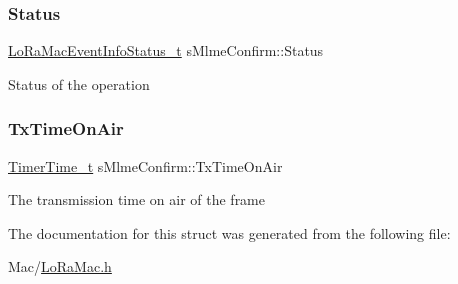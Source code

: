 \subsubsection{\texorpdfstring{Status}{Status}}
{\footnotesize\ttfamily \hyperlink{group__LORAMAC_gac6ffc346a4c767f7a743c87a686c51b4}{Lo\+Ra\+Mac\+Event\+Info\+Status\+\_\+t} s\+Mlme\+Confirm\+::\+Status}

Status of the operation \mbox{\label{structsMlmeConfirm_a56411a350cd4b3f8ee59adc9105e5b5e}} 
\subsubsection{\texorpdfstring{Tx\+Time\+On\+Air}{TxTimeOnAir}}
{\footnotesize\ttfamily \hyperlink{utilities_8h_a4215ca43d3e953099ea758ce428599d0}{Timer\+Time\+\_\+t} s\+Mlme\+Confirm\+::\+Tx\+Time\+On\+Air}

The transmission time on air of the frame 

The documentation for this struct was generated from the following file\+:\begin{DoxyCompactItemize}
\item 
Mac/\hyperlink{LoRaMac_8h}{Lo\+Ra\+Mac.\+h}\end{DoxyCompactItemize}
